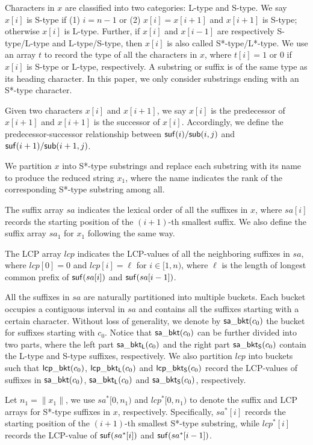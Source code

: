 \documentclass[10pt,journal,compsoc]{IEEEtran}
\begin{document}
Characters in $x$ are classified into two categories: L-type and S-type. We say $x[i]$ is S-type if (1) $i = n - 1$ or (2) $x[i] = x[i + 1]$ and $x[i + 1]$ is S-type; otherwise $x[i]$ is L-type. Further, if $x[i]$ and $x[i - 1]$ are respectively S-type/L-type and L-type/S-type, then $x[i]$ is also called S*-type/L*-type. We use an array $t$ to record the type of all the characters in $x$, where $t[i] = 1$ or $0$ if $x[i]$ is S-type or L-type, respectively. A substring or suffix is of the same type as its heading character. In this paper, we only consider substrings ending with an S*-type character.

Given two characters $x[i]$ and $x[i + 1]$, we say $x[i]$ is the predecessor of $x[i + 1]$ and $x[i + 1]$ is the successor of $x[i]$. Accordingly, we define the predecessor-successor relationship between ${\sf suf}(i)/{\sf sub}(i, j)$ and ${\sf suf}(i + 1)/{\sf sub}(i + 1, j)$.

We partition $x$ into S*-type substrings and replace each substring with its name to produce the reduced string $x_1$, where the name indicates the rank of the corresponding S*-type substring among all. 

The suffix array $sa$ indicates the lexical order of all the suffixes in $x$, where $sa[i]$ records the starting position of the $(i + 1)$-th smallest suffix. We also define the suffix array $sa_1$ for $x_1$ following the same way. 

The LCP array $lcp$ indicates the LCP-values of all the neighboring suffixes in $sa$, where $lcp[0] = 0$ and $lcp[i] = \ell$ for $i \in [1, n)$, where $\ell$ is the length of longest common prefix of ${\sf suf}(sa[i])$ and ${\sf suf}(sa[i - 1])$.

All the suffixes in $sa$ are naturally partitioned into multiple buckets. Each bucket occupies a contiguous interval in $sa$ and contains all the suffixes starting with a certain character. Without loss of generality, we denote by ${\sf sa\_bkt}(c_0)$ the bucket for suffixes starting with $c_0$. Notice that ${\sf sa\_bkt}(c_0)$ can be further divided into two parts, where the left part ${\sf sa\_bkt_L}(c_0)$ and the right part ${\sf sa\_bkt_S}(c_0)$ contain the L-type and S-type suffixes, respectively. We also partition $lcp$ into buckets such that ${\sf lcp\_bkt}(c_0)$, ${\sf lcp\_bkt_L}(c_0)$ and ${\sf lcp\_bkt_S}(c_0)$ record the LCP-values of suffixes in ${\sf sa\_bkt}(c_0)$, ${\sf sa\_bkt_L}(c_0)$ and ${\sf sa\_bkt_S}(c_0)$, respectively.

Let $n_1 = \|x_1\|$, we use $sa^*[0, n_1)$ and $lcp^*[0, n_1)$ to denote the suffix and LCP arrays for S*-type suffixes in $x$, respectively. Specifically, $sa^*[i]$ records the starting position of the $(i + 1)$-th smallest S*-type substring, while $lcp^*[i]$ records the LCP-value of ${\sf suf}(sa^*[i])$ and ${\sf suf}(sa^*[i - 1])$.
\end{document}

